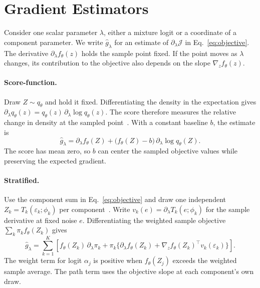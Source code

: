 \section{Gradient Estimators}
\label{sec:methods}
Consider one scalar parameter $\lambda$, either a mixture logit or a coordinate
of a component parameter. We write $\widehat g_\lambda$ for an estimate of
$\partial_\lambda\mathcal J$ in Eq.~\eqref{eq:objective}.
The derivative $\partial_\lambda f_\theta(z)$ holds the sample point fixed.
If the point moves as $\lambda$ changes, its contribution to the objective
also depends on the slope $\nabla_z f_\theta(z)$.

\paragraph*{Score-function.}
Draw $Z\sim q_\theta$ and hold it fixed. Differentiating the density in the
expectation gives $\partial_\lambda q_\theta(z)
=q_\theta(z)\,\partial_\lambda\log q_\theta(z)$. The score therefore measures
the relative change in density at the sampled point~\citep{ranganath2014bbvi}.
With a constant baseline $b$, the estimate is
\begin{equation}
 \widehat g_\lambda
 = \partial_\lambda f_\theta(Z)
   + \bigl(f_\theta(Z)-b\bigr)\,\partial_\lambda\log q_\theta(Z).
 \label{eq:score}
\end{equation}
The score has mean zero, so $b$ can center the sampled objective values
while preserving the expected gradient.

\paragraph*{Stratified.}
Use the component sum in Eq.~\eqref{eq:objective} and draw one independent
$Z_k=T_k(\varepsilon_k;\phi_k)$ per component~\citep{morningstar2021mixtures}. Write
$v_k(e)=\partial_\lambda T_k(e;\phi_k)$ for the sample derivative at fixed
noise $e$. Differentiating the weighted sample objective
$\sum_k\pi_k f_\theta(Z_k)$ gives
\begin{equation}
 \widehat g_\lambda
 = \sum_{k=1}^K \left[
     f_\theta(Z_k)\,\partial_\lambda\pi_k
     + \pi_k\bigl\{\partial_\lambda f_\theta(Z_k)
          + \nabla_z f_\theta(Z_k)^\top v_k(\varepsilon_k)\bigr\}\right].
 \label{eq:stratified}
\end{equation}
The weight term for logit $\alpha_j$ is positive when $f_\theta(Z_j)$ exceeds
the weighted sample average. The path term uses the objective slope at
each component's own draw.

